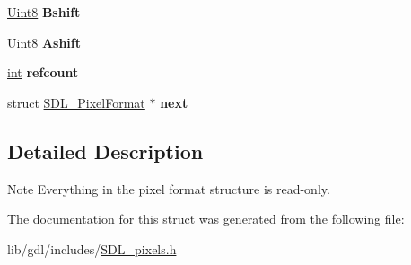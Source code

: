 \begin{DoxyCompactItemize}
\item 
\hypertarget{struct_s_d_l___pixel_format_a4212574b67529628d8822ed4eb109754}{}\hyperlink{_s_d_l__stdinc_8h_a2944638813a090aa23e62f4da842c3e2}{Uint8} {\bfseries Bshift}\label{struct_s_d_l___pixel_format_a4212574b67529628d8822ed4eb109754}

\item 
\hypertarget{struct_s_d_l___pixel_format_ac3c4ffa0de1f2c94040340deede3bf46}{}\hyperlink{_s_d_l__stdinc_8h_a2944638813a090aa23e62f4da842c3e2}{Uint8} {\bfseries Ashift}\label{struct_s_d_l___pixel_format_ac3c4ffa0de1f2c94040340deede3bf46}

\item 
\hypertarget{struct_s_d_l___pixel_format_a23be8060443d58064a720a4e2ef31729}{}\hyperlink{_s_d_l__thread_8h_a6a64f9be4433e4de6e2f2f548cf3c08e}{int} {\bfseries refcount}\label{struct_s_d_l___pixel_format_a23be8060443d58064a720a4e2ef31729}

\item 
\hypertarget{struct_s_d_l___pixel_format_a1953b66c817116bf81bae4873ee6bce5}{}struct \hyperlink{struct_s_d_l___pixel_format}{S\+D\+L\+\_\+\+Pixel\+Format} $\ast$ {\bfseries next}\label{struct_s_d_l___pixel_format_a1953b66c817116bf81bae4873ee6bce5}

\end{DoxyCompactItemize}


\subsection{Detailed Description}
\begin{DoxyNote}{Note}
Everything in the pixel format structure is read-\/only. 
\end{DoxyNote}


The documentation for this struct was generated from the following file\+:\begin{DoxyCompactItemize}
\item 
lib/gdl/includes/\hyperlink{_s_d_l__pixels_8h}{S\+D\+L\+\_\+pixels.\+h}\end{DoxyCompactItemize}
